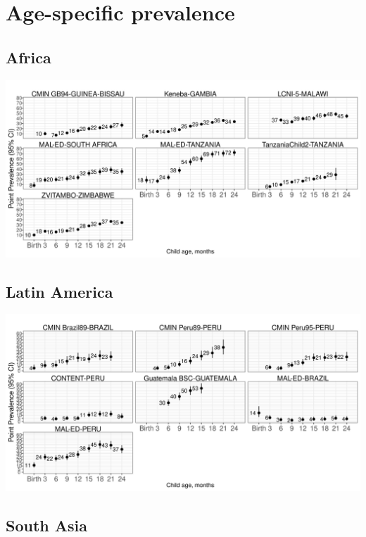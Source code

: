 \documentclass[
  9pt,
]{book}
\begin{document}
\hypertarget{age-specific-prevalence}{%
\section{Age-specific prevalence}\label{age-specific-prevalence}}

\hypertarget{africa-1}{%
\subsection{Africa}\label{africa-1}}

\includegraphics[width=41.67in]{figures//stunting/fig-stunt-2-prev-cohort-africa-allage-primary}

\hypertarget{latin-america-1}{%
\subsection{Latin America}\label{latin-america-1}}

\includegraphics[width=41.67in]{figures//stunting/fig-stunt-2-prev-cohort-latamer-allage-primary}

\hypertarget{south-asia-1}{%
\subsection{South Asia}\label{south-asia-1}}
\end{document}
